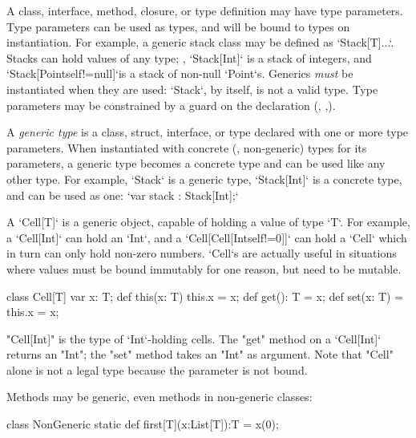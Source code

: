 \label{Generics}

A class, interface, method, closure, or type definition  may have type
parameters.  Type parameters can be used as types, and will be bound to types
on instantiation.  For example, a generic stack class may be defined as 
\xcd`Stack[T]{...}`.  Stacks can hold values of any type; \eg, 
\xcd`Stack[Int]` is a stack of integers, and 
\xcd`Stack[Point{self!=null}]`is a stack of non-null \xcd`Point`s.
Generics {\em must} be instantiated when they are used: \xcd`Stack`, by
itself, is not a valid type.
Type parameters may be constrained by a guard on the declaration
(,
,).

A {\em generic type} is a class, struct,  interface, or type declared with one or
more type parameters.  When instantiated with concrete (\viz, non-generic)
types for its parameters, a generic type becomes a concrete type and can be
used like any other type. For example,
\xcd`Stack` is a generic type, 
\xcd`Stack[Int]` is a concrete type, and can be used as one: 
\xcd`var stack : Stack[Int];`


A \xcd`Cell[T]` is a generic object, capable of holding a value of type
\xcd`T`.  For example, a \xcd`Cell[Int]` can hold an \xcd`Int`, and a
\xcd`Cell[Cell[Int{self!=0}]]` can hold a \xcd`Cell` which in turn can
only hold non-zero numbers.  \xcd`Cell`s are actually useful in situations
where values must be bound immutably for one reason, but need to be mutable.
\begin{xten}
class Cell[T] {
    var x: T;
    def this(x: T) { this.x = x; }
    def get(): T = x;
    def set(x: T) = { this.x = x; }
}
\end{xten}


\xcd"Cell[Int]" is the type of \xcd`Int`-holding cells.  
The \xcd"get" method on a \xcd`Cell[Int]` returns an \xcd"Int"; the
\xcd"set" method takes an \xcd"Int" as argument.  Note that
\xcd"Cell" alone is not a legal type because the parameter is
not bound.

Methods may be generic, even methods in non-generic classes: 
\begin{xten}
class NonGeneric {
  static def first[T](x:List[T]):T = x(0);
}
\end{xten}
%


